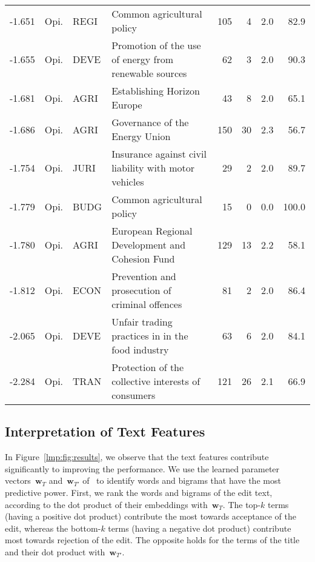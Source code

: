 \begin{sidewaystable}
\begin{tabular}{rlllrrrr}
		-1.651 & Opi. & REGI  & Common agricultural policy                                    & 105      & 4        & 2.0            & 82.9    \\
		-1.655 & Opi. & DEVE  & Promotion of the use of energy from renewable sources         & 62       & 3        & 2.0            & 90.3    \\
		-1.681 & Opi. & AGRI  & Establishing Horizon Europe                                   & 43       & 8        & 2.0            & 65.1    \\
		-1.686 & Opi. & AGRI  & Governance of the Energy Union                                & 150      & 30       & 2.3            & 56.7    \\
		-1.754 & Opi. & JURI  & Insurance against civil liability with motor vehicles         & 29       & 2        & 2.0            & 89.7    \\
		-1.779 & Opi. & BUDG  & Common agricultural policy                                    & 15       & 0        & 0.0            & 100.0   \\
		-1.780 & Opi. & AGRI  & European Regional Development and Cohesion Fund               & 129      & 13       & 2.2            & 58.1    \\
		-1.812 & Opi. & ECON  & Prevention and prosecution of criminal offences               & 81       & 2        & 2.0            & 86.4    \\
		-2.065 & Opi. & DEVE  & Unfair trading practices in in the food industry              & 63       & 6        & 2.0            & 84.1    \\
		-2.284 & Opi. & TRAN  & Protection of the collective interests of consumers           & 121      & 26       & 2.1            & 66.9    \\

		\bottomrule
	\end{tabular}
\end{sidewaystable}

\subsection{Interpretation of Text Features}
\label{lmp:sec:intertext}

In Figure~\ref{lmp:fig:results}, we observe that the text features contribute significantly to improving the performance.
We use the learned parameter vectors~$\boldsymbol{w}_T$ and~$\boldsymbol{w}_{T'}$ of \ to identify words and bigrams that have the most predictive power.
First, we rank the words and bigrams of the edit text, according to the dot product of their embeddings with~$\boldsymbol{w}_T$.
The top-$k$ terms (having a positive dot product) contribute the most towards acceptance of the edit, whereas the bottom-$k$ terms (having a negative dot product) contribute most towards rejection of the edit.
The opposite holds for the terms of the title and their dot product with~$\boldsymbol{w}_{T'}$.

